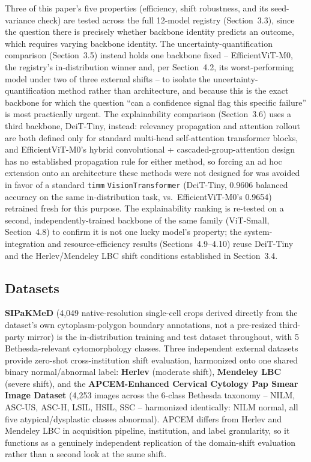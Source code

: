 \documentclass[runningheads]{llncs}
\begin{document}
Three of this paper's five properties (efficiency, shift robustness, and
its seed-variance check) are tested across the full 12-model registry
(Section~3.3), since the question there is precisely whether backbone
identity predicts an outcome, which requires varying backbone identity.
The uncertainty-quantification comparison (Section~3.5) instead holds one
backbone fixed -- EfficientViT-M0, the registry's in-distribution winner
and, per Section~4.2, its worst-performing model under two of three
external shifts -- to isolate the uncertainty-quantification method
rather than architecture, and because this is the exact backbone for
which the question ``can a confidence signal flag this specific failure''
is most practically urgent. The explainability comparison (Section~3.6)
uses a third backbone, DeiT-Tiny, instead: relevancy propagation and
attention rollout are both defined only for standard multi-head
self-attention transformer blocks, and EfficientViT-M0's hybrid
convolutional + cascaded-group-attention design has no established
propagation rule for either method, so forcing an ad hoc extension onto
an architecture these methods were not designed for was avoided in favor
of a standard \texttt{timm} \texttt{VisionTransformer} (DeiT-Tiny, 0.9606
balanced accuracy on the same in-distribution task, vs.\ EfficientViT-M0's
0.9654) retrained fresh for this purpose. The explainability ranking is
re-tested on a second, independently-trained backbone of the same family
(ViT-Small, Section~4.8) to confirm it is not one lucky model's property;
the system-integration and resource-efficiency results (Sections~4.9--4.10)
reuse DeiT-Tiny and the Herlev/Mendeley LBC shift conditions established
in Section~3.4.

\subsection{Datasets}

\textbf{SIPaKMeD} \cite{plissiti2018sipakmed} (4,049 native-resolution
single-cell crops derived directly from the dataset's own
cytoplasm-polygon boundary annotations, not a pre-resized third-party
mirror) is the in-distribution training and test dataset throughout, with
5 Bethesda-relevant cytomorphology classes. Three independent external
datasets provide zero-shot cross-institution shift evaluation, harmonized
onto one shared binary normal/abnormal label: \textbf{Herlev}
\cite{jantzen2005herlev} (moderate shift), \textbf{Mendeley LBC}
\cite{hussain2020mendeley} (severe shift), and the
\textbf{APCEM-Enhanced Cervical Cytology Pap Smear Image Dataset}
\cite{aswini2026apcem} (4,253 images across the 6-class Bethesda taxonomy
-- NILM, ASC-US, ASC-H, LSIL, HSIL, SSC -- harmonized identically: NILM
normal, all five atypical/dysplastic classes abnormal). APCEM differs from
Herlev and Mendeley LBC in acquisition pipeline, institution, and label
granularity, so it functions as a genuinely independent replication of
the domain-shift evaluation rather than a second look at the same shift.
\end{document}
